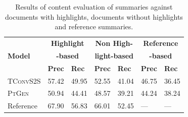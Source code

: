 \documentclass[11pt,a4paper]{article}
\newcommand\todo[1]{{\textcolor{red}{todo: #1}}}
\newcommand\ptgen{\textsc{PtGen}}
\newcommand\tconv{\textsc{TConvS2S}}
\begin{document}




\begin{table}[ht!]
\small
\begin{tabular}{l|p{0.4cm}p{0.6cm}|p{0.4cm}p{0.4cm}|p{0.4cm}p{0.4cm}}
\hline
\multirow{3}{*}{\textbf{Model}}                & \multicolumn{2}{c|}{\textbf{Highlight}}                              & \multicolumn{2}{c|}{\textbf{Non High-}} & 
\multicolumn{2}{c}{\textbf{Reference}}\\
\multirow{2}{*}{}                
& \multicolumn{2}{c|}{\textbf{-based}}                              & \multicolumn{2}{c|}{\textbf{light-based}} & 
\multicolumn{2}{c}{\textbf{-based}}\\
& \textbf{Prec} & \textbf{Rec} 
& \textbf{Prec} & \textbf{Rec}
& \textbf{Prec} & \textbf{Rec} \\ \hline
\tconv{} & 57.42 & 49.95 & 52.55 & 41.04 & 46.75 & 36.45             \\
\ptgen{} & 50.94 & 44.41 & 48.57 & 39.21  & 44.24 & 38.24             \\
Reference & 67.90 & 56.83 & 66.01 & 52.45  & --- & --- \\
\hline
\end{tabular}
\caption{Results of content evaluation of summaries against documents with highlights, documents without highlights and reference summaries.}
\label{table:summresult}
\end{table}
\end{document}

